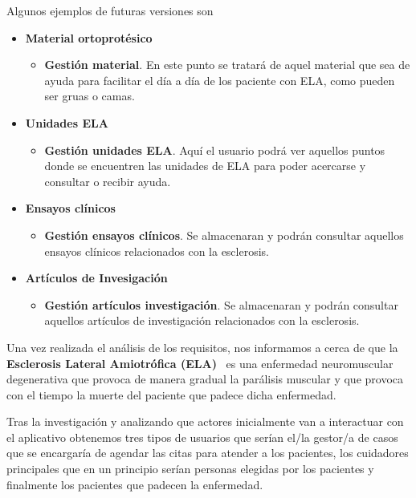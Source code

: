 Algunos ejemplos de futuras versiones son 
\begin{itemize}
\item \textbf{Material ortoprotésico}
			\begin{itemize}
				\item \textbf{Gestión material}. En este punto se tratará de aquel material que sea de ayuda para facilitar el día a día de los paciente con ELA, como pueden ser gruas o camas.
			\end{itemize}
\item \textbf{Unidades ELA}
			\begin{itemize}
				\item \textbf{Gestión unidades ELA}. Aquí el usuario podrá ver aquellos puntos donde se encuentren las unidades de ELA para poder acercarse y consultar o recibir ayuda.
			\end{itemize}
\item \textbf{Ensayos clínicos}
			\begin{itemize}
				\item \textbf{Gestión ensayos clínicos}. Se almacenaran y podrán consultar aquellos ensayos clínicos relacionados con la esclerosis.
			\end{itemize}
\item \textbf{Artículos de Invesigación}
			\begin{itemize}
				\item \textbf{Gestión artículos investigación}. Se almacenaran y podrán consultar aquellos artículos de investigación relacionados con la esclerosis.
			\end{itemize}
\end{itemize}
Una vez realizada el análisis de los requisitos, nos informamos a cerca de que la \textbf{Esclerosis Lateral Amiotrófica (ELA)}~\cite{wiki:ela} es una enfermedad neuromuscular degenerativa que provoca de manera gradual la parálisis muscular y que provoca con el tiempo la muerte del paciente que padece dicha enfermedad.

Tras la investigación y analizando que actores inicialmente van a interactuar con el aplicativo obtenemos tres tipos de usuarios que serían el/la gestor/a de casos que se encargaría de agendar las citas para atender a los pacientes, los cuidadores principales que en un principio serían personas elegidas por los pacientes y finalmente los pacientes que padecen la enfermedad.


